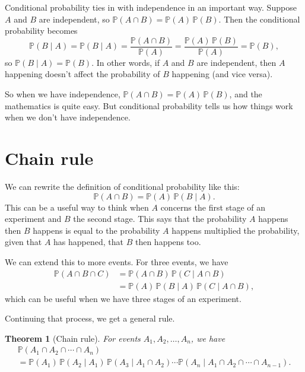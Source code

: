 \documentclass[
  a4paper,
]{book}
\newtheorem{theorem}{Theorem}[chapter]
\theoremstyle{definition}
\theoremstyle{definition}
\theoremstyle{definition}
\theoremstyle{definition}
\theoremstyle{remark}
\begin{document}
Conditional probability ties in with independence in an important way. Suppose \(A\) and \(B\) are independent, so \(\mathbb P(A \cap B) = \mathbb P(A) \, \mathbb P(B)\). Then the conditional probability becomes
\[ \mathbb P(B \mid A) = \mathbb P(B \mid A) = \frac{\mathbb P(A \cap B)}{\mathbb P(A)} =  \frac{\mathbb P(A) \, \mathbb P(B)}{\mathbb P(A)} = \mathbb P(B) , \]
so \(\mathbb P(B \mid A) = \mathbb P(B)\). In other words, if \(A\) and \(B\) are independent, then \(A\) happening doesn't affect the probability of \(B\) happening (and vice versa).

So when we have independence, \(\mathbb P(A \cap B) = \mathbb P(A)\,\mathbb P(B)\), and the mathematics is quite easy. But conditional probability tells us how things work when we don't have independence.

\hypertarget{chain-rule}{%
\section{Chain rule}\label{chain-rule}}

We can rewrite the definition of conditional probability like this:
\[ \mathbb P(A \cap B) = \mathbb P(A)\, \mathbb P(B \mid A). \]
This can be a useful way to think when \(A\) concerns the first stage of an experiment and \(B\) the second stage. This says that the probability \(A\) happens then \(B\) happens is equal to the probability \(A\) happens multiplied the probability, given that \(A\) has happened, that \(B\) then happens too.

We can extend this to more events. For three events, we have
\begin{align*}
\mathbb P(A \cap B \cap C)
  &= \mathbb P(A \cap B) \, \mathbb P(C \mid A \cap B) \\
  &= \mathbb P(A) \, \mathbb P(B \mid A)\, \mathbb P(C \mid A \cap B) ,
\end{align*}
which can be useful when we have three stages of an experiment.

Continuing that process, we get a general rule.

\begin{theorem}[Chain rule]
\protect\hypertarget{thm:thchain}{}\label{thm:thchain}For events \(A_1, A_2, \dots, A_n\), we have
\begin{multline*}  \mathbb P(A_1 \cap A_2 \cap \cdots \cap A_n) \\
  = \mathbb P(A_1) \, \mathbb P(A_2 \mid A_1) \, \mathbb P(A_3 \mid A_1 \cap A_2) \cdots \mathbb P(A_n \mid A_1 \cap A_2 \cap \cdots \cap  A_{n-1}) .\end{multline*}
\end{theorem}
\end{document}
